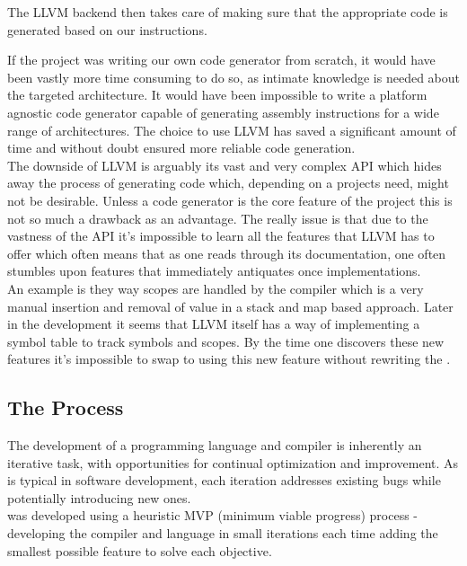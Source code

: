 The LLVM backend then takes care of making sure that the appropriate code is
generated based on our instructions.

If the project was writing our own code generator from scratch, it would have been
vastly more time consuming to do so, as intimate knowledge is needed about the
targeted architecture. It would have been impossible to write a platform agnostic
code generator capable of generating assembly instructions for a wide range of
architectures. The choice to use LLVM has saved a significant amount of time and
without doubt ensured more reliable code generation. \\

The downside of LLVM is arguably its vast and very complex API which hides away the
process of generating code which, depending on a projects need, might not be
desirable. Unless a code generator is the core feature of the project this is not so much a
drawback as an advantage. The really issue is that due to the vastness of the API
it's impossible to learn all the features that LLVM has to offer which often means
that as one reads through its documentation, one often stumbles upon features that
immediately antiquates once implementations. \\

An example is they way scopes are handled by the \lang{} compiler which is a very
manual insertion and removal of value in a stack and map based approach. Later in the
development it seems that LLVM itself has a way of implementing a symbol table to
track symbols and scopes. By the time one discovers these new features it's
impossible to swap to using this new feature without rewriting the \codeGen.

\subsection{The Process}

The development of a programming language and compiler is inherently an iterative
task, with opportunities for continual optimization and improvement. As is typical in
software development, each iteration addresses existing bugs while potentially
introducing new ones. \\

\lang{} was developed using a heuristic MVP (minimum viable progress) process -
developing the compiler and language in small iterations each time adding the
smallest possible feature to solve each objective. \\

